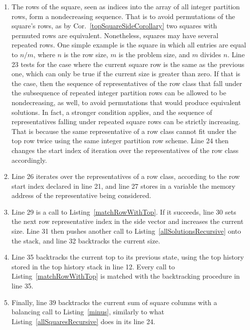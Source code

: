\begin{enumerate}
\addtocounter{enumi}{3}
\item The rows of the square, seen as indices into the array of all integer partition rows, form a nondecreasing sequence. That is to avoid permutations of the square's rows, as by Cor.~\ref{topSquareSideCorollary} two squares with permuted rows are equivalent. Nonetheless, squares may have several repeated rows. One simple example is the square in which all entries are equal to $n / m$, where $n$ is the row size, $m$ is the problem size, and $m$ divides $n$. Line 23 tests for the case where the current square row is the same as the previous one, which can only be true if the current size is greater than zero. If that is the case, then the sequence of representatives of the row class that fall under the subsequence of repeated integer partition rows can be allowed to be nondecreasing, as well, to avoid permutations that would produce equivalent solutions. In fact, a stronger condition applies, and the sequence of representatives falling under repeated square rows can be strictly increasing. That is because the same representative of a row class cannot fit under the top row twice using the same integer partition row scheme. Line 24 then changes the start index of iteration over the representatives of the row class accordingly.
\addtocounter{enumi}{2}
\item Line 26 iterates over the representatives of a row class, according to the row start index declared in line 21, and line 27 stores in a variable the memory address of the representative being considered.
\addtocounter{enumi}{2}
\item Line 29 is a call to Listing~\ref{matchRowWithTop}. If it succeeds, line 30 sets the next row representative index in the side vector and increases the current size. Line 31 then pushes another call to Listing~\ref{allSolutionsRecursive} onto the stack, and line 32 backtracks the current size.
\addtocounter{enumi}{5}
\item Line 35 backtracks the current top to its previous state, using the top history stored in the top history stack in line 12. Every call to Listing~\ref{matchRowWithTop} is matched with the backtracking procedure in line 35.
\addtocounter{enumi}{3}
\item Finally, line 39 backtracks the current sum of square columns with a balancing call to Listing~\ref{minus}, similarly to what Listing~\ref{allSquaresRecursive} does in its line 24.
\end{enumerate}

